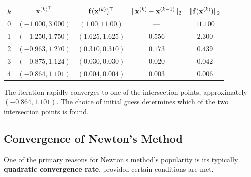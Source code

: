 \begin{exampleBox}
\begin{center}
\begin{tabular}{@{}ccccc@{}}
\toprule
$k$ & $\mathbf{x}^{(k)^\top}$ & $\mathbf{f}(\mathbf{x}^{(k)})^\top$ & $\|\mathbf{x}^{(k)}-\mathbf{x}^{(k-1)}\|_2$ & $\|\mathbf{f}(\mathbf{x}^{(k)})\|_2$ \\ \midrule
0 & $(-1.000, 3.000)$ & $(1.00, 11.00)$ & --- & $11.100$ \\
1 & $(-1.250, 1.750)$ & $(1.625, 1.625)$ & $0.556$ & $2.300$ \\
2 & $(-0.963, 1.270)$ & $(0.310, 0.310)$ & $0.173$ & $0.439$ \\
3 & $(-0.875, 1.124)$ & $(0.030, 0.030)$ & $0.020$ & $0.042$ \\
4 & $(-0.864, 1.101)$ & $(0.004, 0.004)$ & $0.003$ & $0.006$ \\
\bottomrule
\end{tabular}
\end{center}

The iteration rapidly converges to one of the intersection points, approximately $(-0.864, 1.101)$. The choice of initial guess determines which of the two intersection points is found.

\end{exampleBox}

\subsection{Convergence of Newton's Method}
\label{sec:newtons_method_convergence}
One of the primary reasons for Newton's method's popularity is its typically \textbf{quadratic convergence rate}, provided certain conditions are met.

